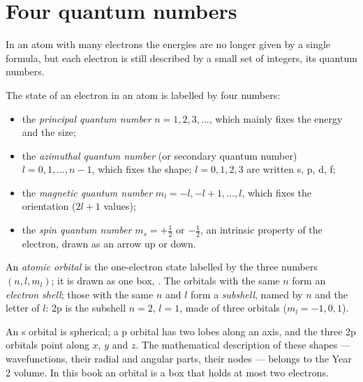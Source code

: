 \section{Four quantum numbers}

In an atom with many electrons the energies are no longer given by a
single formula, but each electron is still described by a small set of
integers, its quantum numbers.

\begin{definition}\label{def:b1:quantum-numbers:quantum-number}
The state of an electron in an atom is labelled by four numbers:
\begin{itemize}
  \item the \emph{principal quantum number}
        $n = 1, 2, 3, \dots$, which mainly fixes the energy and the size;
  \item the \emph{azimuthal quantum number}
        (or secondary quantum number) $l = 0, 1, \dots, n-1$, which fixes
        the shape; $l = 0, 1, 2, 3$ are written s, p, d, f;
  \item the \emph{magnetic quantum number}
        $m_l = -l, -l+1, \dots, l$, which fixes the orientation ($2l + 1$
        values);
  \item the \emph{spin quantum number}
        $m_s = +\tfrac12$ or $-\tfrac12$, an intrinsic property of the
        electron, drawn as an arrow up or down.
\end{itemize}
\end{definition}

\begin{definition}\label{def:b1:quantum-numbers:orbital}
An \emph{atomic orbital} is the one-electron state
labelled by the three numbers $(n, l, m_l)$; it is drawn as one box,
\omorbs{}. The orbitals with the same $n$ form an \emph{electron
shell}; those with the same $n$ and $l$ form a
\emph{subshell}, named by $n$ and the letter of $l$:
2p is the subshell $n = 2$, $l = 1$, made of three orbitals
($m_l = -1, 0, 1$).
\end{definition}

\begin{remark}[Shapes]\label{rem:b1:quantum-numbers:shapes}
An s orbital is spherical; a p orbital has two lobes along an axis, and
the three 2p orbitals point along $x$, $y$ and $z$. The mathematical
description of these shapes --- wavefunctions, their radial and angular
parts, their nodes --- belongs to the Year 2 volume. In this book an
orbital is a box that holds at most two electrons.
\end{remark}

